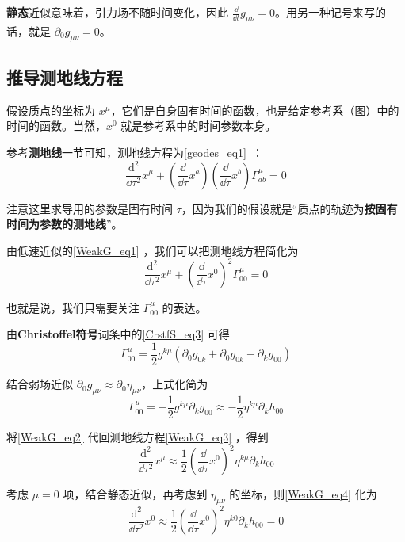 \textbf{静态}近似意味着，引力场不随时间变化，因此 $\frac{\dd}{\dd t}g_{\mu\nu}=0$。用另一种记号来写的话，就是 $\partial_0g_{\mu\nu}=0$。

\subsection{推导测地线方程}

假设质点的坐标为 $x^\mu$，它们是自身固有时间的函数，也是给定参考系（图）中的时间的函数。当然，$x^0$ 就是参考系中的时间参数本身。

参考\textbf{测地线}一节可知，测地线方程为\autoref{geodes_eq1}~：
\begin{equation}
\frac{\mathrm{d}^2}{\dd\tau^2}x^\mu+(\frac{\dd}{\dd\tau}x^a)(\frac{\dd}{\dd\tau}x^b)\Gamma^\mu_{ab}=0
\end{equation}

注意这里求导用的参数是固有时间 $\tau$，因为我们的假设就是“质点的轨迹为\textbf{按固有时间为参数的测地线}”。

由低速近似的\autoref{WeakG_eq1} ，我们可以把测地线方程简化为
\begin{equation}\label{WeakG_eq3}
\frac{\mathrm{d}^2}{\dd\tau^2}x^\mu+(\frac{\dd}{\dd\tau}x^0)^2\Gamma^\mu_{00}=0
\end{equation}

也就是说，我们只需要关注 $\Gamma^\mu_{00}$ 的表达。

由\textbf{Christoffel符号}词条中的\autoref{CrstfS_eq3} 可得
\begin{equation}
\Gamma^\mu_{00}=\frac{1}{2}g^{k\mu}(\partial_0g_{0k}+\partial_0g_{0k}-\partial_{k}g_{00})
\end{equation}

结合弱场近似 $\partial_0g_{\mu\nu}\approx\partial_0\eta_{\mu\nu}$，上式化简为
\begin{equation}\label{WeakG_eq2}
\Gamma^\mu_{00}=-\frac{1}{2}g^{k\mu}\partial_{k}g_{00}\approx-\frac{1}{2}\eta^{k\mu}\partial_{k}h_{00}
\end{equation}

将\autoref{WeakG_eq2} 代回测地线方程\autoref{WeakG_eq3} ，得到
\begin{equation}\label{WeakG_eq4}
\frac{\mathrm{d}^2}{\dd\tau^2}x^\mu\approx\frac{1}{2}(\frac{\dd}{\dd\tau}x^0)^2\eta^{k\mu}\partial_{k}h_{00}
\end{equation}

考虑 $\mu=0$ 项，结合静态近似，再考虑到 $\eta_{\mu\nu}$ 的坐标，则\autoref{WeakG_eq4} 化为
\begin{equation}
\frac{\mathrm{d}^2}{\dd\tau^2}x^0\approx\frac{1}{2}(\frac{\dd}{\dd\tau}x^0)^2\eta^{k0}\partial_{k}h_{00}=0
\end{equation}

